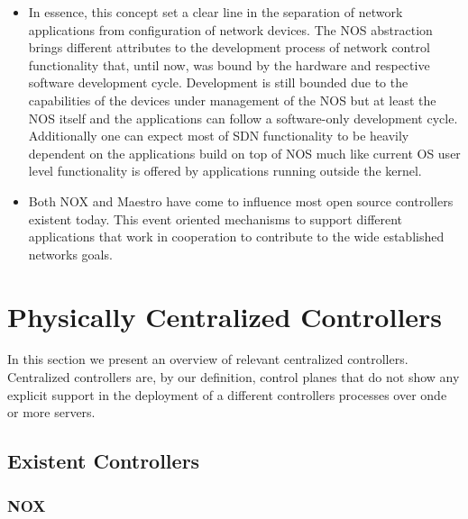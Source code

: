 \begin{itemize}
\begin{itemize}
\item  In essence, this concept set a clear line in the separation of network applications from configuration of network devices. The NOS abstraction brings different attributes to the development process of network control functionality that, until now, was bound by the hardware and respective software development cycle. Development is still bounded due to the capabilities of the devices under management of the NOS but at least the NOS itself and the applications can follow a software-only
development cycle. Additionally one can expect most of SDN functionality to be heavily dependent   on the applications build on top of NOS much like current  OS user level functionality is offered by applications running outside the kernel.



\item Both NOX and Maestro have come to influence most open source controllers existent today. This event oriented mechanisms to support different applications that work in cooperation to contribute to the wide established networks goals. 

\end{itemize}




\section{Physically Centralized  Controllers}
\glsresetall
\label{sec:background:centralized}


In this section we present an overview of relevant centralized
controllers. Centralized controllers are, by our definition, control
planes that do not show any explicit support in the deployment of a
different controllers processes over onde or more servers. 
\subsection{Existent Controllers}
\subsubsection{NOX}
\label{sec:nox}


\end{itemize}
